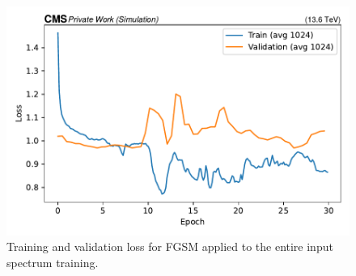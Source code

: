 \documentclass[12pt]{caltech_thesis}
\begin{document}
\begin{figure}[h]
\centering
    \includegraphics[width=13cm]{media/output/intpgd_loss_validation.pdf}
    \caption{Training and validation loss for FGSM applied to the entire input spectrum training.}
    \label{fig:intpgd_train}
\end{figure}






\end{document}
